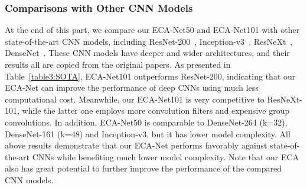 \documentclass[10pt,twocolumn,letterpaper]{article}
\begin{document}
\subsubsection{Comparisons with Other CNN Models}
At the end of this part, we compare our ECA-Net50 and ECA-Net101 with other state-of-the-art CNN models, including ResNet-200~\cite{DBLP:conf/eccv/HeZRS16}, Inception-v3~\cite{DBLP:conf/cvpr/SzegedyVISW16}, ResNeXt~\cite{XieGDTH17}, DenseNet~\cite{Huang_2017_CVPR}. These CNN models have deeper and wider architectures, and their results all are copied from the original papers. As presented in Table~\ref{table3:SOTA}, ECA-Net101 outperforms ResNet-200, indicating that our ECA-Net can improve the performance of deep CNNs using much less computational cost. Meanwhile, our ECA-Net101 is very competitive to ResNeXt-101, while the latter one employs more convolution filters and expensive group convolutions. In addition, ECA-Net50 is comparable to DenseNet-264 (k=32), DenseNet-161 (k=48) and Inception-v3, but it has lower model complexity. All above results demonstrate that our ECA-Net performs favorably against state-of-the-art CNNs while benefiting much lower model complexity. Note that our ECA also has great potential to further improve the performance of the compared CNN models.
\end{document}
